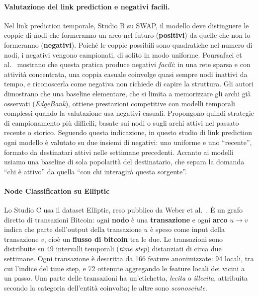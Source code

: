 \documentclass[11pt]{article}
\begin{document}
\paragraph{Valutazione del link prediction e negativi facili.}
Nel link prediction temporale, Studio B su SWAP, il modello deve distinguere le coppie di nodi
che formeranno un arco nel futuro (\textbf{positivi}) da quelle che non lo formeranno
(\textbf{negativi}). Poiché le coppie possibili sono quadratiche nel numero di nodi, i
negativi vengono campionati, di solito in modo uniforme. Poursafaei et al.\
\cite{poursafaei2022better} mostrano che questa pratica produce negativi
\emph{facili}: in una rete sparsa e con attività concentrata, una coppia
casuale coinvolge quasi sempre nodi inattivi da tempo, e riconoscerla come
negativa non richiede di capire la struttura. Gli autori dimostrano che una
baseline elementare, che si limita a memorizzare gli archi già osservati
(\emph{EdgeBank}), ottiene prestazioni competitive con modelli temporali
complessi quando la valutazione usa negativi casuali. Propongono quindi
strategie di campionamento più difficili, basate sui nodi o sugli archi
attivi nel passato recente o storico. Seguendo questa indicazione, in questo
studio di link prediction ogni modello è valutato su due insiemi di negativi:
uno uniforme e uno ``recente'', formato da destinatari attivi nelle settimane
precedenti. Accanto ai modelli usiamo una baseline di sola popolarità del
destinatario, che separa la domanda ``chi è attivo'' da quella ``con chi
interagirà questa sorgente''.

\paragraph{Node Classification su Elliptic}
Lo Studio C usa il dataset Elliptic, reso pubblico da Weber et al.\
\cite{weber2019elliptic}. È un grafo diretto di transazioni Bitcoin: ogni
        \textbf{nodo} è una \textbf{transazione} e ogni \textbf{arco}
$u \to v$ indica che parte dell'output della transazione $u$ è speso come
input della transazione $v$, cioè un \textbf{flusso di bitcoin} tra le due. Le
transazioni sono distribuite su 49 intervalli temporali (\emph{time step})
distanziati di circa due settimane. Ogni transazione è descritta da 166
feature anonimizzate: 94 locali, tra cui l'indice del time step, e 72
ottenute aggregando le feature locali dei vicini a un passo. Una parte delle
transazioni ha un'etichetta, \emph{lecita} o \emph{illecita}, attribuita
secondo la categoria dell'entità coinvolta; le altre sono
\emph{sconosciute}.
\end{document}
